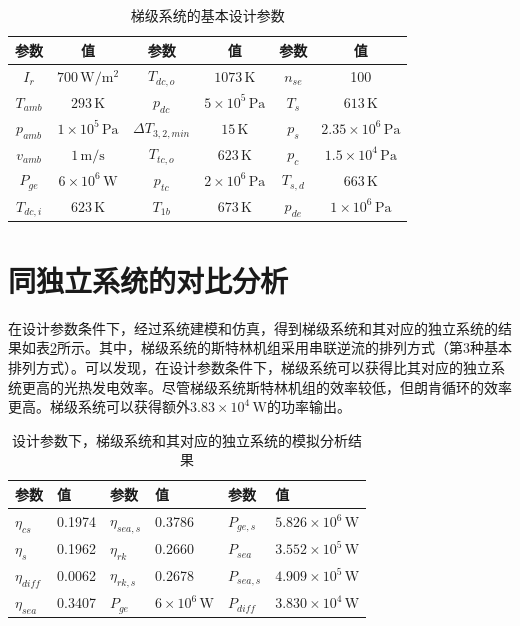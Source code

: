 \begin{table}[htbp]
\setlength{\abovecaptionskip}{0pt}
	\caption{梯级系统的基本设计参数}
	\centering
	\begin{tabular}{cccccc}
		\toprule
		参数		&	值	&	参数		&	值	&	参数		&	值\\
		\midrule
		$I_r$		&	$700\,\mathrm{W/m^2}$	&	$T_{dc,o}$	&	$1073\,\mathrm{K}$	&	$n_{se}$	&	100\\
		$T_{amb}$	&	$293\,\mathrm{K}$	&	$p_{dc}$		&	$5\times10^5\,\mathrm{Pa}$	&	$T_s$	&	$613\,\mathrm{K}$\\
		$p_{amb}$	&	$1\times10^5\,\mathrm{Pa}$	&	$\Delta{}T_{3,2,min}$	&	$15\,\mathrm{K}$	&	$p_s$	&	$2.35\times10^6\,\mathrm{Pa}$\\
		$v_{amb}$	&	$1\,\mathrm{m/s}$	&	$T_{tc,o}$	&	$623\,\mathrm{K}$	&	$p_c$	&	$1.5\times10^4\,\mathrm{Pa}$\\
		$P_{ge}$	&	$6\times10^6\,\mathrm{W}$	&	
$p_{tc}$	&	$2\times10^6\,\mathrm{Pa}$	&	$T_{s,d}$	&	$663\,\mathrm{K}$\\
		$T_{dc,i}$		&	$623\,\mathrm{K}$	&	$T_{1b}$	&	$673\,\mathrm{K}$	&	$p_{de}$ 	& 	$1\times10^6\,\mathrm{Pa}$\\
	\bottomrule
	\end{tabular}
	\label{tab:CascadeSystemParameters}
\end{table}

\section{同独立系统的对比分析}

在设计参数条件下，经过系统建模和仿真，得到梯级系统和其对应的独立系统的结果如表\ref{tab:importantResults}所示。其中，梯级系统的斯特林机组采用串联逆流的排列方式（第3种基本排列方式）。可以发现，在设计参数条件下，梯级系统可以获得比其对应的独立系统更高的光热发电效率。尽管梯级系统斯特林机组的效率较低，但朗肯循环的效率更高。梯级系统可以获得额外$3.83\times10^4\,\mathrm{W}$的功率输出。

\begin{table}[htbp]
\setlength{\abovecaptionskip}{0pt}
	\caption{设计参数下，梯级系统和其对应的独立系统的模拟分析结果}
	\centering
	\begin{tabular}{p{1cm}<{\centering} p{1.75cm}<{\centering} p{1cm}<{\centering} p{1.75cm}<{\centering} p{1cm}<{\centering} p{3cm}<{\centering}}
		\toprule
		参数		&	值	&	参数		&	值	&	参数		&	值\\
		\midrule
		$\eta_{cs}$		&	0.1974	&	$\eta_{sea,s}$	&	0.3786	&	$P_{ge,s}$	&	$5.826\times10^6\,\mathrm{W}$\\
		$\eta_{s}$	&	0.1962	&	$\eta_{rk}$	&	0.2660	&	$P_{sea}$		&	$3.552\times10^5\,\mathrm{W}$\\
		$\eta_{diff}$		&	0.0062	&	$\eta_{rk,s}$	&	0.2678	&	$P_{sea,s}$	&	$4.909\times10^5\,\mathrm{W}$\\
		$\eta_{sea}$	&	0.3407	&	$P_{ge}$		&	$6\times10^6\,\mathrm{W}$	&	$P_{diff}$		&	$3.830\times10^4\,\mathrm{W}$\\
		\bottomrule
	\end{tabular}
	\label{tab:importantResults}
\end{table}

